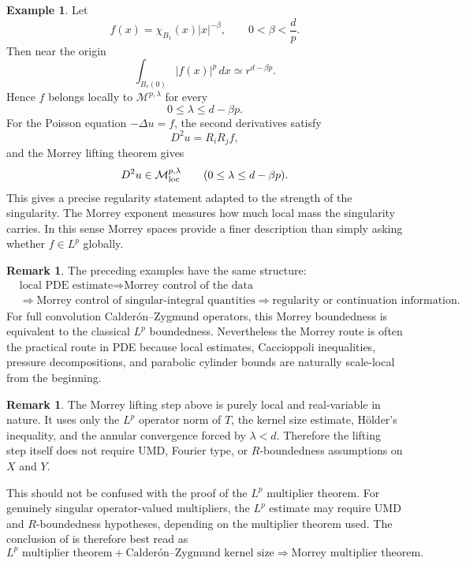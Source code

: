 \documentclass[11pt]{article}
\theoremstyle{definition}
\newtheorem{remark}[theorem]{Remark}
\newtheorem{example}[theorem]{Example}
\begin{document}
\begin{example}\label{ex:localized-singular-data-morrey}
Let
\[
        f(x)=\chi_{B_1}(x)|x|^{-\beta},
        \qquad 0<\beta<\frac{d}{p}.
\]
Then near the origin
\[
        \int_{B_r(0)} |f(x)|^p\,dx
        \simeq
        r^{d-\beta p}.
\]
Hence $f$ belongs locally to $\mathcal M^{p,\lambda}$ for every
\[
        0\le\lambda\le d-\beta p.
\]
For the Poisson equation $-\Delta u=f$, the second derivatives satisfy
\[
        D^2u=R_iR_j f,
\]
and the Morrey lifting theorem gives
\[
        D^2u\in \mathcal M^{p,\lambda}_{\rm loc}
        \qquad
        (0\le\lambda\le d-\beta p).
\]
This gives a precise regularity statement adapted to the strength of the singularity.  The Morrey exponent measures how much local mass the singularity carries.  In this sense Morrey spaces provide a finer description than simply asking whether $f\in L^p$ globally.
\end{example}

\begin{remark}\label{rem:local-pde-examples-summary}
The preceding examples have the same structure:
\[
\begin{aligned}
        &\text{local PDE estimate}
        \Longrightarrow
        \text{Morrey control of the data} \\
        &\Longrightarrow
        \text{Morrey control of singular-integral quantities}
        \Longrightarrow
        \text{regularity or continuation information}.
\end{aligned}
\]
For full convolution Calder\'on--Zygmund operators, this Morrey boundedness is equivalent to the classical $L^p$ boundedness.  Nevertheless the Morrey route is often the practical route in PDE because local estimates, Caccioppoli inequalities, pressure decompositions, and parabolic cylinder bounds are naturally scale-local from the beginning.
\end{remark}

\begin{remark}\label{rem:umd-rbound-morrey-lifting}
		The Morrey lifting step above is purely local and real-variable in nature.  It uses only the $L^p$ operator norm of $T$, the kernel size estimate, H\"older's inequality, and the annular convergence forced by $\lambda<d$.  Therefore the lifting step itself does not require UMD, Fourier type, or $R$-boundedness assumptions on $X$ and $Y$.

		This should not be confused with the proof of the $L^p$ multiplier theorem.  For genuinely singular operator-valued multipliers, the $L^p$ estimate may require UMD and $R$-boundedness hypotheses, depending on the multiplier theorem used.  The conclusion of  is therefore best read as
		\[
		\text{\(L^p\) multiplier theorem}+\text{Calder\'on--Zygmund kernel size}
		\Longrightarrow
		\text{Morrey multiplier theorem}.
		\]
	\end{remark}
\end{document}
